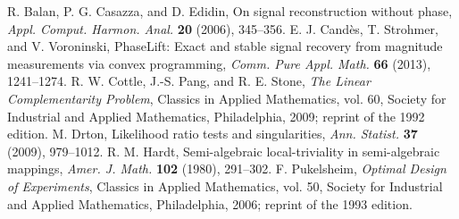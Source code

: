  R. Balan, P. G. Casazza, and D. Edidin,
On signal reconstruction without phase,
\emph{Appl. Comput. Harmon. Anal.} \textbf{20} (2006), 345--356.
 E. J. Cand\`es, T. Strohmer, and V. Voroninski,
PhaseLift: Exact and stable signal recovery from magnitude measurements via convex programming,
\emph{Comm. Pure Appl. Math.} \textbf{66} (2013), 1241--1274.
 R. W. Cottle, J.-S. Pang, and R. E. Stone,
\emph{The Linear Complementarity Problem}, Classics in Applied Mathematics, vol. 60,
Society for Industrial and Applied Mathematics, Philadelphia, 2009; reprint of the 1992 edition.
 M. Drton,
Likelihood ratio tests and singularities,
\emph{Ann. Statist.} \textbf{37} (2009), 979--1012.
 R. M. Hardt,
Semi-algebraic local-triviality in semi-algebraic mappings,
\emph{Amer. J. Math.} \textbf{102} (1980), 291--302.
 F. Pukelsheim,
\emph{Optimal Design of Experiments}, Classics in Applied Mathematics, vol. 50,
Society for Industrial and Applied Mathematics, Philadelphia, 2006; reprint of the 1993 edition.
